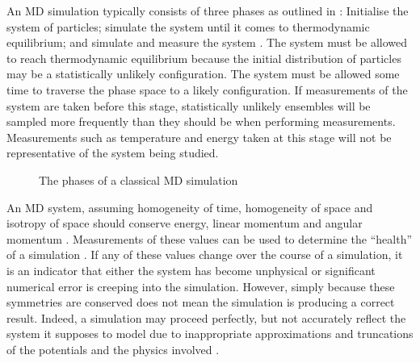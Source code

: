 %
An MD simulation typically consists of three phases as outlined in
:
Initialise the system of particles;
simulate the system until it comes to thermodynamic equilibrium; and
simulate and measure the system
\cite[p.~394]{schlick2010molecular}.
%
The system must be allowed to reach thermodynamic equilibrium because
the initial distribution of particles may be a statistically unlikely
configuration.
%
The system must be allowed some time to traverse the phase space to
a likely configuration.
%
If measurements of the system are taken before this stage,
statistically unlikely ensembles will be sampled more frequently than
they should be when performing measurements.
%
Measurements such as
temperature and energy
taken at this stage will not be
representative of the system being studied.

\begin{figure}
    \begin{center}
    \end{center}
    \caption{The phases of a classical MD simulation}
    \label{fig:phases_of_md_simulation}
\end{figure}


%
An MD system,
assuming homogeneity of time,
homogeneity of space and
isotropy of space
should conserve energy, linear momentum and angular momentum
\cite{landau1976mechanics}.
%
Measurements of these values can be used to
determine the ``health'' of a simulation
\cite[p.~72]{frenkel2001understanding}.
%
If any of these values change over the course of a simulation,
it is an indicator that either the system has become unphysical or
significant numerical error is creeping into the simulation.
%
However, simply because these symmetries are conserved does not mean
the simulation is producing a correct result.
%
Indeed, a simulation may proceed perfectly, but not accurately reflect
the system it supposes to model due to
inappropriate approximations and truncations of
the potentials and the physics involved
\cite{patra2003molecular}.




